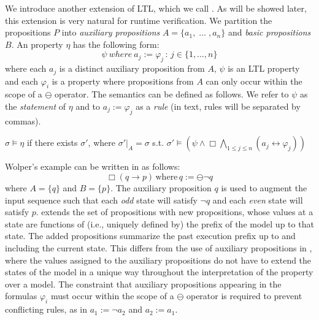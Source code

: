 \vspace{1.5ex}
We introduce another extension of LTL, which we call \ELTL{}.
As will be showed later, this extension
is very natural for runtime verification.
%
We partition the propositions $P$ into
{\em auxiliary propositions} $A = \{ a_1 , \; \ldots\; , a_n \}$
and {\em basic propositions} $B$.
An \ELTL{} property $\eta$ has the following form: 
\begin{equation} \label{ELTL}
\psi \mathit{\ where\ } a_j  := \varphi_j \, : \, 
 {j \in \{1, \ldots , n\}} \end{equation}
where each $a_j$ is a distinct auxiliary proposition from $A$,
$\psi$ is an LTL property and each $\varphi_i$ 
is a \PLTL{} property where propositions from $A$ can
only occur within the scope of a $\ominus$ operator.
The semantics can be defined as follows. We refer to $\psi$
as the {\em statement} of $\eta$ and to 
$a_j  := \varphi_j$ as a {\em rule} (in text, rules
 will be separated  by commas). 

\begin{center}
$\sigma \models \eta$ if there exists $\sigma'$, where
$\sigma' |_A = \sigma$ s.t.  
 $\sigma' \models ( \psi  \wedge   \Box \bigwedge_{1 \leq j \leq n} ( a_j \leftrightarrow \varphi_j)) $
 \end{center}

\noindent
Wolper's example can be written in \ELTL{}
as follows:
\begin{equation} 
\label{form3}
\Box ( q \rightarrow p ) \, \mathrm{where} \, 
  q := \ominus \neg q
\end{equation}
where $A = \{ q\}$ and $B = \{ p \}$.
The auxiliary proposition $q$ is used to augment the input sequence such that each {\em odd} state will satisfy $\neg q$
and each {\em even} state will satisfy $p$.  
%
\ELTL{} extends the set of propositions with new propositions, whose values at a state are
functions of (i.e., uniquely defined by) the prefix of the model up to that state. The added propositions summarize the past execution prefix up to and
including the current state.
This differs from 
the use of auxiliary propositions in \QLTL{}, where the values assigned to the
auxiliary propositions do not have to extend the 
states of the model in a unique way throughout the interpretation of 
the property over a model. The constraint that auxiliary propositions appearing in the formulas $\varphi_i$ 
must occur within the scope of a $\ominus$ operator
is required to prevent conflicting rules, as in
$a_1 := \neg a_2$ and $a_2 := a_1$.

